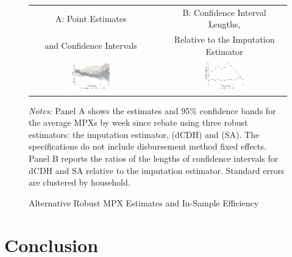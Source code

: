 \documentclass[english,11pt]{article}
\providecommand{\tabularnewline}{\\}
\theoremstyle{plain}
\theoremstyle{plain}
\theoremstyle{plain}
\theoremstyle{plain}
\begin{document}
\begin{figure}
\caption{Alternative Robust MPX Estimates and In-Sample Efficiency\label{fig:efficiency_real}}

{\small{}\medskip{}
}{\small\par}
\begin{centering}
\begin{tabular}{ccc}
{\small{}A: Point Estimates} &  & {\small{}B: Confidence Interval Lengths,}\tabularnewline
{\small{}and Confidence Intervals} &  & {\small{}Relative to the Imputation Estimator}\tabularnewline
\includegraphics[width=0.35\textwidth]{Graphs/Figure6_A} &  & \includegraphics[width=0.35\textwidth]{Graphs/Figure6_B}\tabularnewline
\end{tabular}
\par\end{centering}
\emph{\footnotesize{}Notes:}{\footnotesize{} Panel A shows the estimates
and 95\% confidence bands for the average MPXs by week since rebate
using three robust estimators: the imputation estimator, \textcite{DeChaisemartin2020}
(dCDH) and \textcite{Abraham2018} (SA). The specifications do not
include disbursement method fixed effects. Panel B reports the ratios
of the lengths of confidence intervals for dCDH and SA relative to
the imputation estimator. Standard errors are clustered by household.}{\footnotesize\par}
\end{figure}


\section{Conclusion}
\end{document}
